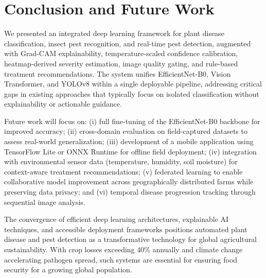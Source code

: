 \documentclass[conference]{IEEEtran}
\begin{document}
\section{Conclusion and Future Work}

We presented an integrated deep learning framework for plant disease classification, insect pest recognition, and real-time pest detection, augmented with Grad-CAM explainability, temperature-scaled confidence calibration, heatmap-derived severity estimation, image quality gating, and rule-based treatment recommendations. The system unifies EfficientNet-B0, Vision Transformer, and YOLOv8 within a single deployable pipeline, addressing critical gaps in existing approaches that typically focus on isolated classification without explainability or actionable guidance.

Future work will focus on: (i) full fine-tuning of the EfficientNet-B0 backbone for improved accuracy; (ii) cross-domain evaluation on field-captured datasets to assess real-world generalization; (iii) development of a mobile application using TensorFlow Lite or ONNX Runtime for offline field deployment; (iv) integration with environmental sensor data (temperature, humidity, soil moisture) for context-aware treatment recommendations; (v) federated learning to enable collaborative model improvement across geographically distributed farms while preserving data privacy; and (vi) temporal disease progression tracking through sequential image analysis.

The convergence of efficient deep learning architectures, explainable AI techniques, and accessible deployment frameworks positions automated plant disease and pest detection as a transformative technology for global agricultural sustainability. With crop losses exceeding 40\% annually and climate change accelerating pathogen spread, such systems are essential for ensuring food security for a growing global population.
\end{document}
